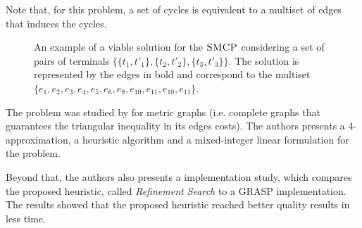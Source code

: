 Note that, for this problem, a set of cycles is equivalent to a multiset of edges that induces the cycles.

\begin{figure}
    \centering
{}
    \caption{An example of a viable solution for the \(\textsc{SMCP}\) considering a set of pairs of terminals \(\{\{t_1, t'_1\}, \{t_2, t'_2\}, \{t_3, t' _3\}\}\). The solution is represented by the edges in bold and correspond to the multiset \(\{e_1, e_2, e_3, e_4, e_5, e_6, e_9, e_{10}, e_{11}, e_{10}, e_{11}\}\).}
    \label{fig:exem_multicycle}
\end{figure}


The problem was studied by \cite{Pereira2018TheSM} for metric graphs (i.e. complete graphs that guarantees the triangular inequality in its edges costs). The authors presents a 4-approximation, a heuristic algorithm and a mixed-integer linear formulation for the problem.

Beyond that, the authors also presents a implementation study, which compares the proposed heuristic, called \textit{Refinement Search} to a GRASP implementation. The results showed that the proposed heuristic reached better quality results in less time.

